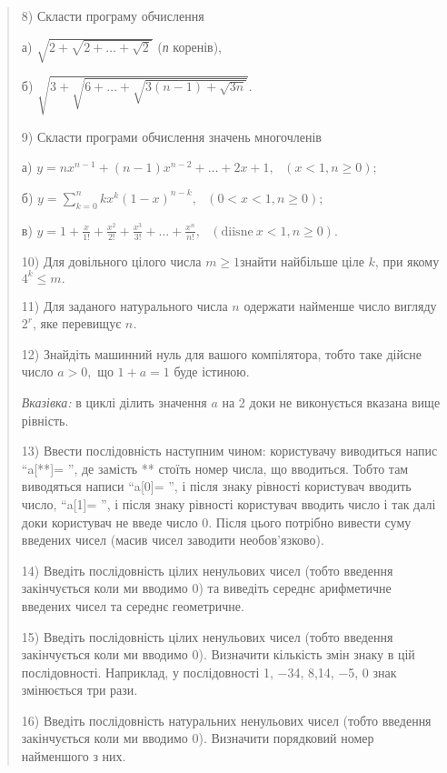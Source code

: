 \documentclass[]{article}
\begin{document}
\begin{quote}
8) Скласти програму обчислення

а) \(\sqrt{2 + \sqrt{2 + \ldots + \sqrt{2}}}\) (\emph{п} коренів),

б) \(\sqrt{3 + \sqrt{6 + \ldots + \sqrt{3(n - 1) + \sqrt{3n}}}}.\)

9) Скласти програми обчислення значень многочленів

а)
\(y = nx^{n - 1} + (n - 1)x^{n - 2} + \ldots + 2x + 1,\mathrm{\text{\ \ \ }}(x < 1,n \geq 0);\)

б)
\(y = \sum_{k = 0}^{n}{kx^{k}(1 - x)^{n - k}},\mathrm{\text{\ \ \ \ \ \ \ \ \ \ \ \ \ \ \ \ \ \ \ \ \ \ \ \ \ \ }}(0 < x < 1,n \geq 0);\)

в)
\(y = 1 + \frac{x}{1!} + \frac{x^{2}}{2!} + \frac{x^{3}}{3!} + \ldots + \frac{x^{n}}{n!},\mathrm{\text{\ \ \ \ \ \ \ \ \ \ \ }}(\mathrm{diisne\ }x < 1,n \geq 0).\)

10) Для довільного цілого числа \(m \geq 1\)знайти найбільше ціле \(k\),
при якому \(4^{k} \leq m.\)

11) Для заданого натурального числа \(n\) одержати найменше число
вигляду \(2^{r}\), яке перевищує \(n\)\emph{.}

12) Знайдіть машинний нуль для вашого компілятора, тобто таке дійсне
число \(a > 0,\) що \(1 + a = 1\) буде істиною.

\emph{Вказівка:} в циклі ділить значення \(a\) на 2 доки не виконується
вказана вище рівність.

13) Ввести послідовність наступним чином: користувачу виводиться напис
``a{[}**{]}= '', де замість ** стоїть номер числа, що вводиться. Тобто
там виводяться написи ``a{[}0{]}= '', і після знаку рівності користувач
вводить число, ``a{[}1{]}= '', і після знаку рівності користувач вводить
число і так далі доки користувач не введе число 0. Після цього потрібно
вивести суму введених чисел (масив чисел заводити необов'язково).

14) Введіть послідовність цілих ненульових чисел (тобто введення
закінчується коли ми вводимо 0) та виведіть середнє арифметичне введених
чисел та середнє геометричне.

15) Введіть послідовність цілих ненульових чисел (тобто введення
закінчується коли ми вводимо 0). Визначити кількість змін знаку в цій
послідовності. Наприклад, у послідовності 1, −34, 8,14, −5, 0 знак
змінюється три рази.

16) Введіть послідовність натуральних ненульових чисел (тобто введення
закінчується коли ми вводимо 0). Визначити порядковий номер найменшого з
них.


\end{quote}
\end{document}
